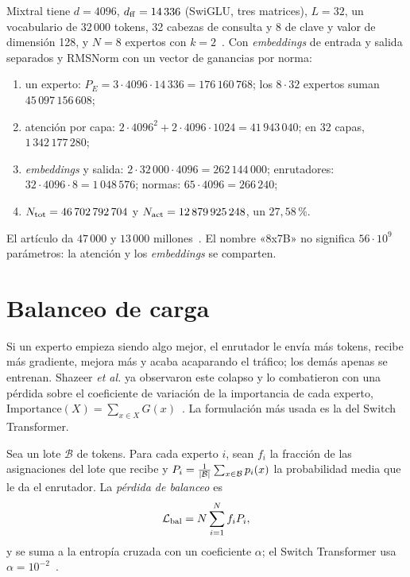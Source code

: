 \begin{ejemplo}[Mixtral 8x7B]\label{ej:mixtral}
Mixtral tiene $d=4096$, $d_{\mathrm{ff}}=14\,336$ (SwiGLU, tres matrices), $L=32$, un vocabulario de $32\,000$ tokens, 32 cabezas de consulta y 8 de clave y valor de dimensión 128, y $N=8$ expertos con $k=2$~\cite[tabla~1]{mixtral}. Con \emph{embeddings} de entrada y salida separados y RMSNorm con un vector de ganancias por norma:
\begin{enumerate}[label=\arabic*.]
  \item un experto: $P_E=3\cdot 4096\cdot 14\,336=176\,160\,768$; los $8\cdot 32$ expertos suman $45\,097\,156\,608$;
  \item atención por capa: $2\cdot 4096^{2}+2\cdot 4096\cdot 1024=41\,943\,040$; en 32 capas, $1\,342\,177\,280$;
  \item \emph{embeddings} y salida: $2\cdot 32\,000\cdot 4096=262\,144\,000$; enrutadores: $32\cdot 4096\cdot 8=1\,048\,576$; normas: $65\cdot 4096=266\,240$;
  \item $N_{\mathrm{tot}}=46\,702\,792\,704$ y $N_{\mathrm{act}}=12\,879\,925\,248$, un $27{,}58\,\%$.
\end{enumerate}
El artículo da $47\,000$ y $13\,000$ millones~\cite{mixtral}. El nombre «8x7B» no significa $56\cdot 10^{9}$ parámetros: la atención y los \emph{embeddings} se comparten.
\end{ejemplo}

\section{Balanceo de carga}

Si un experto empieza siendo algo mejor, el enrutador le envía más tokens, recibe más gradiente, mejora más y acaba acaparando el tráfico; los demás apenas se entrenan. Shazeer \emph{et al.} ya observaron este colapso y lo combatieron con una pérdida sobre el coeficiente de variación de la importancia de cada experto, $\mathrm{Importance}(X)=\sum_{x\in X}G(x)$~\cite[§4]{shazeer2017}. La formulación más usada es la del Switch Transformer.

\begin{definicion}\label{def:bal}
Sea un lote $\mathcal B$ de tokens. Para cada experto $i$, sean $f_i$ la fracción de las asignaciones del lote que recibe y $P_i=\frac{1}{\lvert\mathcal B\rvert}\sum_{x\in\mathcal B}p_i(x)$ la probabilidad media que le da el enrutador. La \emph{pérdida de balanceo} es
\[
\mathcal{L}_{\mathrm{bal}}=N\sum_{i=1}^{N}f_iP_i,
\]
y se suma a la entropía cruzada con un coeficiente $\alpha$; el Switch Transformer usa $\alpha=10^{-2}$~\cite[§2.2, ecs.~4--6]{switch}.
\end{definicion}

